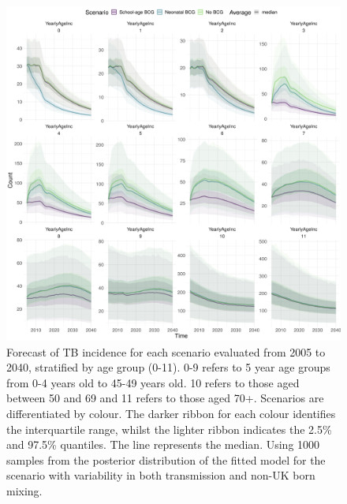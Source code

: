 \documentclass[11pt,twoside]{bristolthesis}
\begin{document}
  \newpage
  \begin{figure}
  
  {\centering \includegraphics[width=0.8\linewidth]{chapters/model-fitting/plots/overview-scenarios-future-age-1} 
  
  }
  
  \caption[Forecast of TB incidence for each scenario evaluated from 2005 to 2040, stratified by age group.]{Forecast of TB incidence for each scenario evaluated from 2005 to 2040, stratified by age group (0-11). 0-9 refers to 5 year age groups from 0-4 years old to 45-49 years old. 10 refers to those aged between 50 and 69 and 11 refers to those aged 70+. Scenarios are differentiated by colour. The darker ribbon for each colour identifies the interquartile range, whilst the lighter ribbon indicates the 2.5\% and 97.5\% quantiles. The line represents the median. Using 1000 samples from the posterior distribution of the fitted model for the scenario with variability in both transmission and non-UK born mixing.}\label{fig:10-age-scenarios-fig}
  \end{figure}
  \newpage
  
\end{document}
